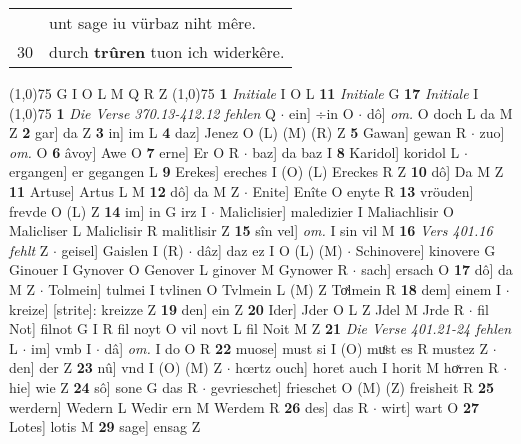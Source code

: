 \documentclass[8pt,a4paper,notitlepage]{article}
\begin{document}
\begin{table}[ht]
\begin{minipage}[t]{0.5\linewidth}
\begin{tabular}{rl}
 & unt sage iu vürbaz niht mêre.\\ 
30 & durch \textbf{trûren} tuon ich widerkêre.\\ 
\end{tabular}
\scriptsize
\line(1,0){75} \newline
G I O L M Q R Z \newline
\line(1,0){75} \newline
\textbf{1} \textit{Initiale} I O L  \textbf{11} \textit{Initiale} G  \textbf{17} \textit{Initiale} I  \newline
\line(1,0){75} \newline
\textbf{1} \textit{Die Verse 370.13-412.12 fehlen} Q   $\cdot$ ein] ÷in O  $\cdot$ dô] \textit{om.} O doch L da M Z \textbf{2} gar] da Z \textbf{3} in] im L \textbf{4} daz] Jenez O (L) (M) (R) Z \textbf{5} Gawan] gewan R  $\cdot$ zuo] \textit{om.} O \textbf{6} âvoy] Awe O \textbf{7} erne] Er O R  $\cdot$ baz] da baz I \textbf{8} Karidol] koridol L  $\cdot$ ergangen] er gegangen L \textbf{9} Erekes] ereches I (O) (L) Ereckes R Z \textbf{10} dô] Da M Z \textbf{11} Artuse] Artus L M \textbf{12} dô] da M Z  $\cdot$ Enite] Enîte O enyte R \textbf{13} vröuden] frevde O (L) Z \textbf{14} im] in G irz I  $\cdot$ Maliclisier] maledizier I Maliachlisir O Malicliser L Maliclisir R malitlisir Z \textbf{15} sîn vel] \textit{om.} I sin vil M \textbf{16} \textit{Vers 401.16 fehlt} Z   $\cdot$ geisel] Gaislen I (R)  $\cdot$ dâz] daz ez I O (L) (M)  $\cdot$ Schinovere] kinovere G Ginouer I Gynover O Genover L ginover M Gynower R  $\cdot$ sach] ersach O \textbf{17} dô] da M Z  $\cdot$ Tolmein] tulmei I tvlinen O Tvlmein L (M) Z Toͯlmein R \textbf{18} dem] einem I  $\cdot$ kreize] [strite]: kreizze Z \textbf{19} den] ein Z \textbf{20} Ider] Jder O L Z Jdel M Jrde R  $\cdot$ fil Not] filnot G I R fil noyt O vil novt L fil Noit M Z \textbf{21} \textit{Die Verse 401.21-24 fehlen} L   $\cdot$ im] vmb I  $\cdot$ dâ] \textit{om.} I do O R \textbf{22} muose] must si I (O) muͦst es R mustez Z  $\cdot$ den] der Z \textbf{23} nû] vnd I (O) (M) Z  $\cdot$ hœrtz ouch] horet auch I horit M hoͯrren R  $\cdot$ hie] wie Z \textbf{24} sô] sone G das R  $\cdot$ gevrieschet] frieschet O (M) (Z) freisheit R \textbf{25} werdern] Wedern L Wedir ern M Werdem R \textbf{26} des] das R  $\cdot$ wirt] wart O \textbf{27} Lotes] lotis M \textbf{29} sage] ensag Z \newline
\end{minipage}
\hspace{0.5cm}
\begin{minipage}[t]{0.5\linewidth}

\end{minipage}
\end{table}
\end{document}
